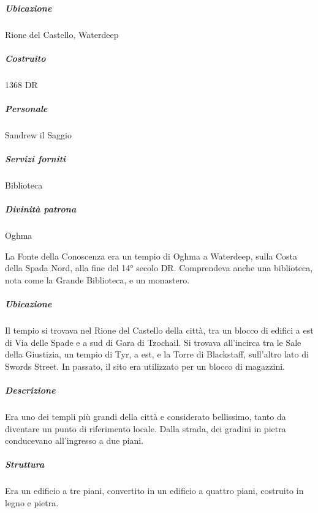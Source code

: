 \documentclass{article}
\begin{document}
              \subparagraph{Ubicazione}
              Rione del Castello, Waterdeep
              
              \subparagraph{Costruito}
              1368 DR
              
              \subparagraph{Personale}
              Sandrew il Saggio
              
              \subparagraph{Servizi forniti}
              Biblioteca
              
              \subparagraph{Divinità patrona}
              Oghma
              
              La Fonte della Conoscenza era un tempio di Oghma a Waterdeep, sulla Costa della Spada Nord, alla fine del 14° secolo DR. Comprendeva anche una biblioteca, nota come la Grande Biblioteca, e un monastero.
              
              \subparagraph{Ubicazione}
              Il tempio si trovava nel Rione del Castello della città, tra un blocco di edifici a est di Via delle Spade e a sud di Gara di Tzochail. Si trovava all'incirca tra le Sale della Giustizia, un tempio di Tyr, a est, e la Torre di Blackstaff, sull'altro lato di Swords Street. In passato, il sito era utilizzato per un blocco di magazzini.
              
              \subparagraph{Descrizione}
              Era uno dei templi più grandi della città e considerato bellissimo, tanto da diventare un punto di riferimento locale. Dalla strada, dei gradini in pietra conducevano all'ingresso a due piani.
              
              \subparagraph{Struttura}
              Era un edificio a tre piani, convertito in un edificio a quattro piani, costruito in legno e pietra.
\end{document}
